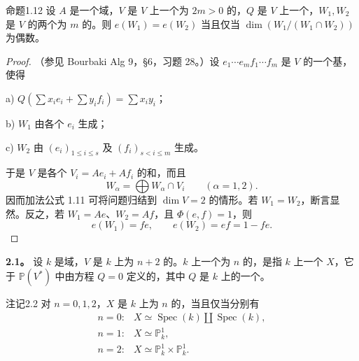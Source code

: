 \begin{SGAresult}{命题}{1.12}
设 $A$ 是一个域，$V$ 是 $V$ 上一个为 $2m>0$ 的，$Q$ 是 $V$ 上一个，$W_1,W_2$ 是 $V$ 的两个为 $m$ 的。则 $e(W_1)=e(W_2)$ 当且仅当 $\dim(W_1/(W_1\cap W_2))$ 为偶数。
\end{SGAresult}
\begin{proof}
（参见 Bourbaki Alg 9，§6，习题 28。）设 $e_1\cdots e_m f_1\cdots f_m$ 是 $V$ 的一个基，使得

\noindent a) $Q(\sum x_ie_i+\sum y_if_i)=\sum x_iy_i$；

\noindent b) $W_1$ 由各个 $e_i$ 生成；

\noindent c) $W_2$ 由 $(e_i)_{1\le i\le s}$ 及 $(f_i)_{s<i\le m}$ 生成。

于是 $V$ 是各个 $V_i=Ae_i+Af_i$ 的和，而且
\[
W_\alpha=\bigoplus W_\alpha\cap V_i\qquad(\alpha=1,2).
\]
因而加法公式 1.11 可将问题归结到 $\dim V=2$ 的情形。若 $W_1=W_2$，断言显然。反之，若 $W_1=Ae$、$W_2=Af$，且 $\Phi(e,f)=1$，则
\[
e(W_1)=fe,\qquad e(W_2)=ef=1-fe.
\]
\end{proof}

\textbf{2.1。} 设 $k$ 是域，$V$ 是 $k$ 上为 $n+2$ 的。$k$ 上一个为 $n$ 的，是指 $k$ 上一个 $X$，它于 $\mathbb P(V^*)$ 中由方程 $Q=0$ 定义的，其中 $Q$ 是 $k$ 上的一个。

\begin{SGAresult}{注记}{2.2}
对 $n=0,1,2$，$X$ 是 $k$ 上为 $n$ 的，当且仅当分别有
\[
\begin{array}{ll}
n=0:&X\simeq\operatorname{Spec}(k)\amalg\operatorname{Spec}(k),\\
n=1:&X\simeq\mathbb P^1_k,\\
n=2:&X\simeq\mathbb P^1_k\times\mathbb P^1_k.
\end{array}
\]
\end{SGAresult}


